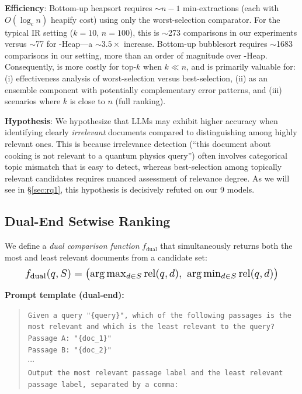 \textbf{Efficiency}: Bottom-up heapsort requires $\sim$$n-1$ min-extractions (each with $O(\log_c n)$ heapify cost) using only the worst-selection comparator. For the typical IR setting ($k=10$, $n=100$), this is $\sim$273 comparisons in our experiments versus $\sim$77 for \topdown{}-Heap---a $\sim$$3.5\times$ increase. Bottom-up bubblesort requires $\sim$1683 comparisons in our setting, more than an order of magnitude over \topdown{}-Heap. Consequently, \bottomup{} is more costly for top-$k$ when $k \ll n$, and is primarily valuable for: (i) effectiveness analysis of worst-selection versus best-selection, (ii) as an ensemble component with potentially complementary error patterns, and (iii) scenarios where $k$ is close to $n$ (full ranking).

\textbf{Hypothesis}: We hypothesize that LLMs may exhibit higher accuracy when identifying clearly \emph{irrelevant} documents compared to distinguishing among highly relevant ones. This is because irrelevance detection (``this document about cooking is not relevant to a quantum physics query'') often involves categorical topic mismatch that is easy to detect, whereas best-selection among topically relevant candidates requires nuanced assessment of relevance degree. As we will see in \S\ref{sec:rq1}, this hypothesis is decisively refuted on our 9 models.


\subsection{Dual-End Setwise Ranking}
\label{sec:dualend}

We define a \emph{dual comparison function} $f_{\text{dual}}$ that simultaneously returns both the most and least relevant documents from a candidate set:
\begin{equation}
\resizebox{0.90\columnwidth}{!}{$
f_{\text{dual}}(q, S) = \bigl(\arg\max_{d \in S} \text{rel}(q,d),\ \arg\min_{d \in S} \text{rel}(q,d)\bigr)
$}
\label{eq:fdual}
\end{equation}

\textbf{Prompt template (dual-end):}
\begin{quote}
\small\texttt{Given a query "\{query\}", which of the following passages is the most relevant and which is the least relevant to the query?}\\
\texttt{Passage A: "\{doc\_1\}"}\\
\texttt{Passage B: "\{doc\_2\}"}\\
$\cdots$\\
\texttt{Output the most relevant passage label and the least relevant passage label, separated by a comma:}
\end{quote}

